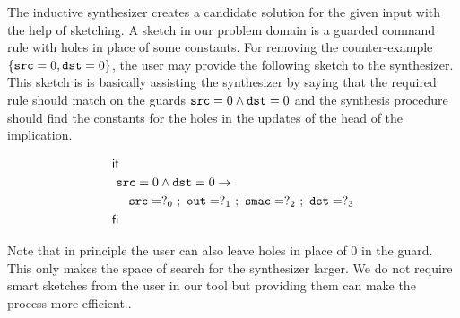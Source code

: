 

The inductive synthesizer creates a candidate solution for the given input with the help of sketching.
A sketch in our problem domain is a guarded command rule with holes in place of some constants.
For removing the counter-example $\{\mbox{\ttfamily src}=0,\mbox{\ttfamily dst}=0\}$, 
the user may provide the following sketch to the synthesizer.
This sketch is is basically assisting the synthesizer by saying that 
the required rule should match on the guards $\mbox{\ttfamily src}=0\wedge\mbox{\ttfamily dst}=0$
and the synthesis procedure should find the constants for the holes in the updates of the head of the implication.

\[
\begin{aligned}
 &\mathsf{if} \\
 &~\mbox{\ttfamily src}=0\wedge\mbox{\ttfamily dst}=0 \to \\
 &~~~~\mbox{\ttfamily src}=?_0~;~\mbox{\ttfamily out}=?_1~;~\mbox{\ttfamily smac}=?_2~;~\mbox{\ttfamily dst}=?_3 \\
 &\mathsf{fi}
\end{aligned}
\]

Note that in principle the user can also leave holes in place of $0$ in the guard.
This only makes the space of search for the synthesizer larger.
We do not require smart sketches from the user in our tool but providing them can 
make the process more efficient..










